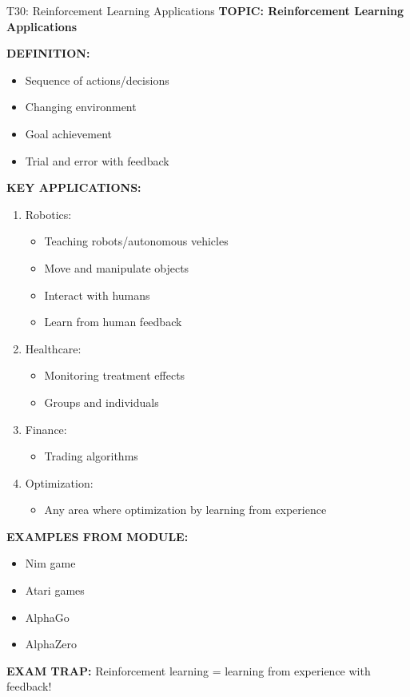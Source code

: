 \documentclass[8pt]{beamer}
\begin{document}
	\begin{frame}{T30: Reinforcement Learning Applications}
		\fontsize{6.5}{7.5}\selectfont
		\textbf{TOPIC: Reinforcement Learning Applications}
		
		\vspace{0.1cm}
		\textbf{DEFINITION:}
		\begin{itemize}
			\item Sequence of actions/decisions
			\item Changing environment
			\item Goal achievement
			\item Trial and error with feedback
		\end{itemize}
		
		\vspace{0.1cm}
		\textbf{KEY APPLICATIONS:}
		\begin{enumerate}
			\item \textcolor{myblue}{Robotics:}
			\begin{itemize}
				\item Teaching robots/autonomous vehicles
				\item Move and manipulate objects
				\item Interact with humans
				\item Learn from human feedback
			\end{itemize}
			\item \textcolor{myblue}{Healthcare:}
			\begin{itemize}
				\item Monitoring treatment effects
				\item Groups and individuals
			\end{itemize}
			\item \textcolor{myblue}{Finance:}
			\begin{itemize}
				\item Trading algorithms
			\end{itemize}
			\item \textcolor{myblue}{Optimization:}
			\begin{itemize}
				\item Any area where optimization by learning from experience
			\end{itemize}
		\end{enumerate}
		
		\vspace{0.1cm}
		\textbf{EXAMPLES FROM MODULE:}
		\begin{itemize}
			\item Nim game
			\item Atari games
			\item AlphaGo
			\item AlphaZero
		\end{itemize}
		
		\textcolor{myred}{\textbf{EXAM TRAP:}} Reinforcement learning = \textcolor{myblue}{learning from experience with feedback}!
	\end{frame}
	
\end{document}
